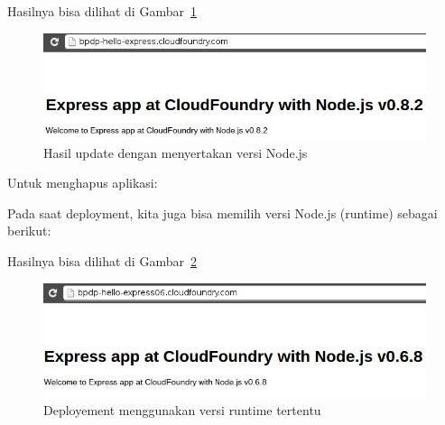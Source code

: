 \lstset{language=bash,caption=Mengupdate aplikasi di server}


Hasilnya bisa dilihat di Gambar~\ref{fig:modul1-hello-update}

  \begin{figure}
    \begin{center}
      \includegraphics[scale=0.5]{images/bpdp-hello-express-update.jpg}
    \end{center}
    \caption{Hasil update dengan menyertakan versi Node.js}
    \label{fig:modul1-hello-update}
  \end{figure}

Untuk menghapus aplikasi:

\lstset{language=bash,caption=Menghapus aplikasi yang di-deploy di CF}


Pada saat deployment, kita juga bisa memilih versi Node.js (runtime) sebagai berikut:

\lstset{language=bash,caption=Deployment ke CF dengan memilih runtime Node.js}



Hasilnya bisa dilihat di Gambar~\ref{fig:modul1-hello-ganti-runtime}

  \begin{figure}
    \begin{center}
      \includegraphics[scale=0.5]{images/bpdp-express-hello-update06.jpg}
    \end{center}
    \caption{Deployement menggunakan versi runtime tertentu}
    \label{fig:modul1-hello-ganti-runtime}
  \end{figure}

